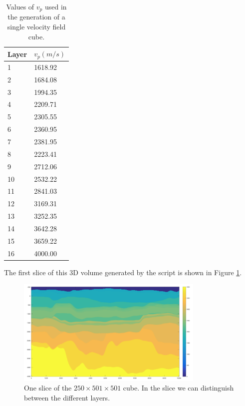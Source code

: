 \begin{table}[H]
\begin{center}
    \begin{tabular}{|l|l|}
    \hline
    \textbf{Layer} & $v_{p}(m/s)$ \\ \hline
    1     & 1618.92 \\ \hline
    2     & 1684.08 \\ \hline
    3     & 1994.35 \\ \hline
    4     & 2209.71 \\ \hline
    5     & 2305.55 \\ \hline
    6     & 2360.95 \\ \hline
    7     & 2381.95 \\ \hline
    8     & 2223.41 \\ \hline
    9     & 2712.06 \\ \hline
    10    & 2532.22 \\ \hline
    11    & 2841.03 \\ \hline
    12    & 3169.31 \\ \hline
    13    & 3252.35 \\ \hline
    14    & 3642.28 \\ \hline
    15    & 3659.22 \\ \hline
    16    & 4000.00 \\ \hline
    \end{tabular}
    \caption {Values of $v_{p}$ used in the generation of a single velocity field cube.}
    \label{tab:valuesOfVp}
    \end{center}
\end{table}

The first slice of this 3D volume generated by the script is shown in Figure \ref{fig:slice1}.

\begin{figure}[H]
    \centering
    \includegraphics[width=0.8\textwidth]{images/velocity_field.png}
    \caption{One slice of the $250\times501\times501$ cube. In the slice we can distinguish between the different layers.}
    \label{fig:slice1}
\end{figure}

